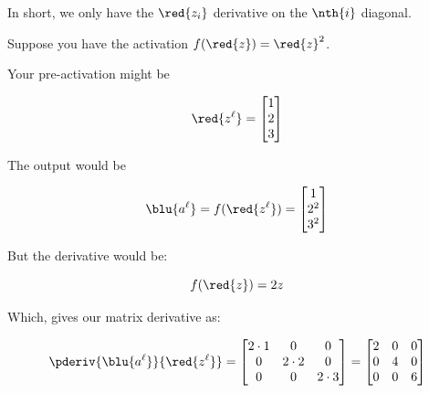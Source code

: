         
        
        In short, we only have the $\red{z_i}$ derivative on the $\nth{i}$ diagonal.
        
        \miniex Suppose you have the activation $f(\red{z}) = \red{z}^2$.
        
        Your pre-activation might be 
        
        \begin{equation}
            \red{z^\ell} = 
            \begin{bmatrix}
                1 \\ 2 \\ 3
            \end{bmatrix}
        \end{equation}
        
        The output would be 
        
        \begin{equation}
            \blu{a^\ell} 
            = 
            f(\red{z^\ell})
            = 
            \begin{bmatrix}
                1 \\ 2^2 \\ 3^2
            \end{bmatrix}
        \end{equation}
        
        But the derivative would be:
        
        \begin{equation}
            f(\red{z}) = 2z
        \end{equation}
        
        Which, gives our matrix derivative as:
        
        \begin{equation*}
            \pderiv {\blu{a^\ell}}   {\red{z^\ell}}
            =
            \begin{bmatrix}
                2\cdot 1 & 0         & 0         \\
                0        & 2 \cdot 2 & 0         \\
                0        & 0         & 2 \cdot 3 \\
            \end{bmatrix}
            =
            \begin{bmatrix}
                2 & 0 & 0  \\
                0 & 4 & 0  \\
                0 & 0 & 6  \\
            \end{bmatrix}
        \end{equation*}
        
